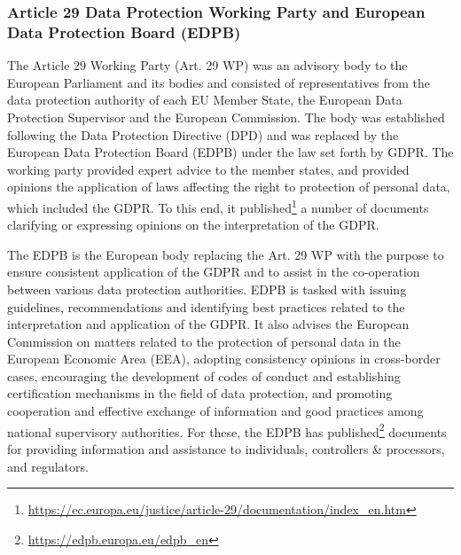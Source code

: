 \subsubsection{Article 29 Data Protection Working Party and European Data Protection Board (EDPB)}
The Article 29 Working Party (Art. 29 WP) was an advisory body to the European Parliament and its bodies and consisted of representatives from the data protection authority of each EU Member State, the European Data Protection Supervisor and the European Commission. 
The body was established following the Data Protection Directive (DPD) and was replaced by the European Data Protection Board (EDPB) under the law set forth by GDPR. 
The working party provided expert advice to the member states, and provided opinions the application of laws affecting the right to protection of personal data, which included the GDPR.
To this end, it published\footnote{\url{https://ec.europa.eu/justice/article-29/documentation/index_en.htm}} a number of documents clarifying or expressing opinions on the interpretation of the GDPR.

The EDPB is the European body replacing the Art. 29 WP with the purpose to ensure consistent application of the GDPR and to assist in the co-operation between various data protection authorities. 
EDPB is tasked with issuing guidelines, recommendations and identifying best practices related to the interpretation and application of the GDPR.
It also advises the European Commission on matters related to the protection of personal data in the European Economic Area (EEA), adopting consistency opinions in cross-border cases, encouraging the development of codes of conduct and establishing certification mechanisms in the field of data protection, and promoting cooperation and effective exchange of information and good practices among national supervisory authorities. 
For these, the EDPB has published\footnote{\url{https://edpb.europa.eu/edpb_en}} documents for providing information and assistance to individuals, controllers \& processors, and regulators.


